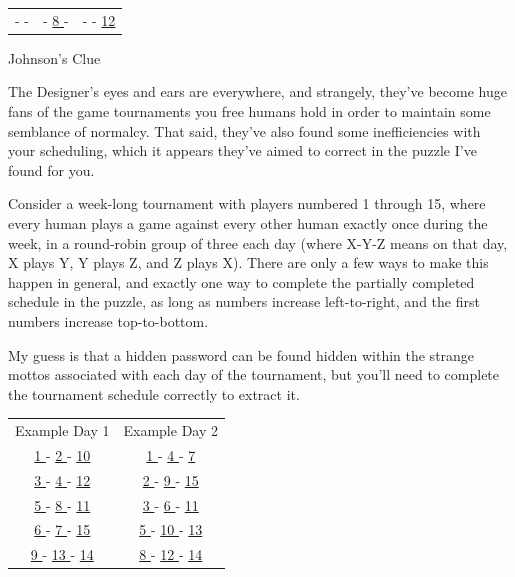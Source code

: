 \documentclass{article}
\newcommand{\clue}[1]{#1}
\begin{document}
\begin{center}
\begin{tabular}{ c  c  c }
 \underline{ \hspace{.1in} } - \underline{ \hspace{.1in} } - \underline{ \hspace{.1in} }&  
 \underline{ \hspace{.1in} } - \underline{ 8 } - \underline{ \hspace{.1in} } &  
 \underline{ \hspace{.1in} } - \underline{ \hspace{.1in} } - \underline{ 12 } \\
 
\end{tabular}
\end{center}

\vfill

\newpage

\clue{
Johnson's Clue

The Designer's eyes and ears are everywhere, and strangely,
they've become huge fans of the game tournaments you free humans
hold in order to maintain some semblance of normalcy. That said,
they've also found some inefficiencies with your scheduling,
which it appears they've aimed to correct in the puzzle
I've found for you.

Consider a week-long tournament with players numbered 1 through 15,
where every human plays a game against every other human exactly
once during the week, in a round-robin group of three each day
(where X-Y-Z means on that day, X plays Y, Y plays Z, and Z plays
X). There are only a few ways to make this happen in general, and exactly
one way to complete the partially completed
schedule in the puzzle, as long as numbers
increase left-to-right, and the first numbers increase top-to-bottom.

My guess is that a hidden password can be found hidden within
the strange mottos associated with each day of the tournament,
but you'll need to complete the tournament schedule correctly
to extract it.

\begin{center}
\begin{tabular}{ c c }
Example Day 1 & Example Day 2 \\
 \underline{ 1 } - \underline{ 2 } - \underline{ 10 } &
 \underline{ 1 } - \underline{ 4 } - \underline{ 7 } \\
 \underline{ 3 } - \underline{ 4 } - \underline{ 12 } &
 \underline{ 2 } - \underline{ 9 } - \underline{ 15 } \\
 \underline{ 5 } - \underline{ 8 } - \underline{ 11 } &
 \underline{ 3 } - \underline{ 6 } - \underline{ 11 } \\
 \underline{ 6 } - \underline{ 7 } - \underline{ 15 } &
 \underline{ 5 } - \underline{ 10 } - \underline{ 13 } \\
 \underline{ 9 } - \underline{ 13 } - \underline{ 14 } &
 \underline{ 8 } - \underline{ 12 } - \underline{ 14 } \\
\end{tabular}
\end{center}
}
\end{document}

